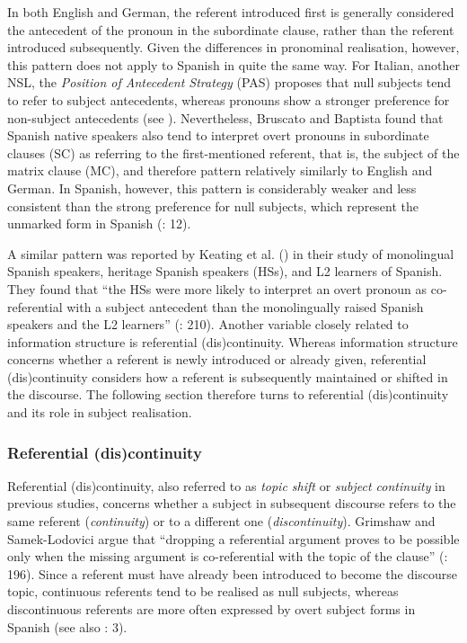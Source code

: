 \documentclass[
  letterpaper,
  DIV=11,
  numbers=noendperiod]{scrartcl}
\begin{document}
In both English and German, the referent introduced first is generally
considered the antecedent of the pronoun in the subordinate clause,
rather than the referent introduced subsequently. Given the differences
in pronominal realisation, however, this pattern does not apply to
Spanish in quite the same way. For Italian, another NSL, the
\emph{Position of Antecedent Strategy} (PAS) proposes that null subjects
tend to refer to subject antecedents, whereas pronouns show a stronger
preference for non-subject antecedents (see
). Nevertheless, Bruscato
and Baptista found that Spanish native speakers also tend to interpret
overt pronouns in subordinate clauses (SC) as referring to the
first-mentioned referent, that is, the subject of the matrix clause
(MC), and therefore pattern relatively similarly to English and German.
In Spanish, however, this pattern is considerably weaker and less
consistent than the strong preference for null subjects, which represent
the unmarked form in Spanish (: 12).

A similar pattern was reported by Keating et al.
() in their study of monolingual Spanish
speakers, heritage Spanish speakers (HSs), and L2 learners of Spanish.
They found that ``the HSs were more likely to interpret an overt pronoun
as co-referential with a subject antecedent than the monolingually
raised Spanish speakers and the L2 learners''
(: 210). Another
variable closely related to information structure is referential
(dis)continuity. Whereas information structure concerns whether a
referent is newly introduced or already given, referential
(dis)continuity considers how a referent is subsequently maintained or
shifted in the discourse. The following section therefore turns to
referential (dis)continuity and its role in subject realisation.

\subsubsection{Referential
(dis)continuity}\label{sec-ReferentialContinuity}

Referential (dis)continuity, also referred to as \emph{topic shift} or
\emph{subject continuity} in previous studies, concerns whether a
subject in subsequent discourse refers to the same referent
(\emph{continuity}) or to a different one (\emph{discontinuity}).
Grimshaw and Samek-Lodovici argue that ``dropping a referential argument
proves to be possible only when the missing argument is co-referential
with the topic of the clause'' (: 196). Since a referent must have already been
introduced to become the discourse topic, continuous referents tend to
be realised as null subjects, whereas discontinuous referents are more
often expressed by overt subject forms in Spanish (see also
: 3).
\end{document}
